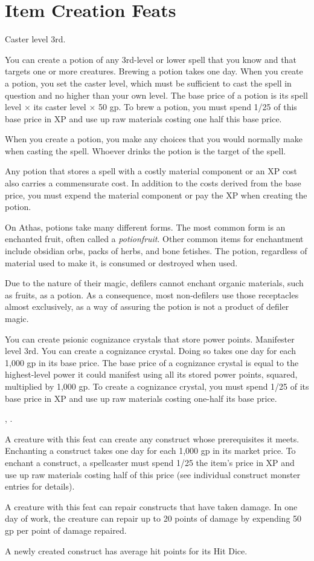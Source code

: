 \section{Item Creation Feats}

{}
{Caster level 3rd.}
{You can create a potion of any 3rd-level or lower spell that you know and that targets one or more creatures. Brewing a potion takes one day. When you create a potion, you set the caster level, which must be sufficient to cast the spell in question and no higher than your own level. The base price of a potion is its spell level $\times$ its caster level $\times$ 50 gp. To brew a potion, you must spend 1/25 of this base price in XP and use up raw materials costing one half this base price.

When you create a potion, you make any choices that you would normally make when casting the spell. Whoever drinks the potion is the target of the spell.

Any potion that stores a spell with a costly material component or an XP cost also carries a commensurate cost. In addition to the costs derived from the base price, you must expend the material component or pay the XP when creating the potion.}
{}
{On Athas, potions take many different forms. The most common form is an enchanted fruit, often called a \emph{potionfruit}. Other common items for enchantment include obsidian orbs, packs of herbs, and bone fetishes. The potion, regardless of material used to make it, is consumed or destroyed when used.

Due to the nature of their magic, defilers cannot enchant organic materials, such as fruits, as a potion. As a consequence, most non‐defilers use those receptacles almost exclusively, as a way of assuring the potion is not a product of defiler magic.}

{You can create psionic cognizance crystals that store power points.}
{Manifester level 3rd.}
{You can create a cognizance crystal. Doing so takes one day for each 1,000 gp in its base price. The base price of a cognizance crystal is equal to the highest-level power it could manifest using all its stored power points, squared, multiplied by 1,000 gp. To create a cognizance crystal, you must spend 1/25 of its base price in XP and use up raw materials costing one-half its base price.}{}{}

{, .}
{A creature with this feat can create any construct whose prerequisites it meets. Enchanting a construct takes one day for each 1,000 gp in its market price. To enchant a construct, a spellcaster must spend 1/25 the item’s price in XP and use up raw materials costing half of this price (see individual construct monster entries for details).

A creature with this feat can repair constructs that have taken damage. In one day of work, the creature can repair up to 20 points of damage by expending 50 gp per point of damage repaired.

A newly created construct has average hit points for its Hit Dice.}

